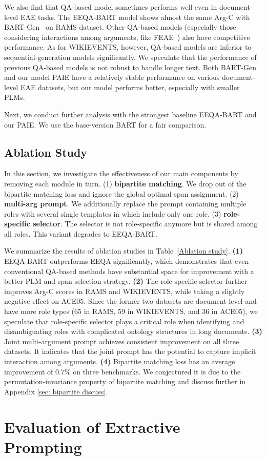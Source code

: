 We also find that QA-based model sometimes performs well even in document-level EAE tasks. The EEQA-BART model shows almost the same Arg-C with BART-Gen~\cite{li-etal-2021-document} on RAMS dataset. Other QA-based models (especially those considering interactions among arguments, like FEAE~\cite{wei-etal-2021-trigger}) also have competitive performance. As for WIKIEVENTS, however, QA-based models are inferior to sequential-generation models significantly. We speculate that the performance of previous QA-based models is not robust to handle longer text.
Both BART-Gen~\cite{li-etal-2021-document} and our model PAIE have a relatively stable performance on various document-level EAE datasets, but our model performs better, especially with smaller PLMs. 

Next, we conduct further analysis with the strongest baseline EEQA-BART and our PAIE. We use the base-version BART for a fair comparison.

\subsection{Ablation Study}
\label{subsec: ablation study}

In this section, we investigate the effectiveness of our main components by removing each module in turn. (1) \textbf{bipartite matching}. We drop out of the bipartite matching loss and ignore the global optimal span assignment. (2) \textbf{multi-arg prompt}. We additionally replace the prompt containing multiple roles with several single templates in which include only one role. (3) \textbf{role-specific selector}. The selector is not role-specific anymore but is shared among all roles. This variant degrades to EEQA-BART.

We summarize the results of ablation studies in Table~\ref{Ablation study}. \textbf{(1)} EEQA-BART outperforms EEQA significantly, which demonstrates that even conventional QA-based methods have substantial space for improvement with a better PLM and span selection strategy. \textbf{(2)} The role-specific selector further improves Arg-C scores in RAMS and WIKIEVENTS, while taking a slightly negative effect on ACE05. Since the former two datasets are document-level and have more role types (65 in RAMS, 59 in WIKIEVENTS, and 36 in ACE05), we speculate that role-specific selector plays a critical role when identifying and disambiguating roles with complicated ontology structures in long documents.  \textbf{(3)} Joint multi-argument prompt achieves consistent improvement on all three datasets. It indicates that the joint prompt has the potential to capture implicit interaction among arguments. \textbf{(4)} Bipartite matching loss has an average improvement of $0.7\%$ on three benchmarks. We conjectured it is due to the permutation-invariance property of bipartite matching and discuss further in Appendix \ref{sec: bipartite discuss}.\section{Evaluation of Extractive Prompting}

